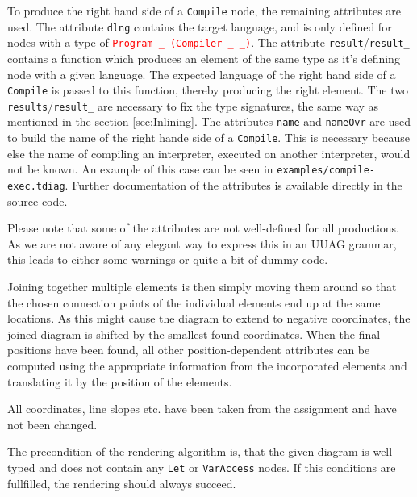 \documentclass[12pt, a4paper, twoside]{article}
\newcommand{\red}[1]{\textcolor{red}{#1}}
\begin{document}
To produce the right hand side of a \texttt{Compile} node, the remaining attributes are used. The attribute
\texttt{dlng} contains the target language, and is only defined for nodes with a type of \red{\texttt{Program \_ (Compiler \_ \_)}}.
The attribute \texttt{result}/\texttt{result\_} contains a function which produces an element of the same type
as it's defining node with a given language. The expected language of the right hand side of a \texttt{Compile} is 
passed to this function, thereby producing the right element.
The two \texttt{results}/\texttt{result\_} are necessary to fix the type signatures, the same way as mentioned
in the section \ref{sec:Inlining}.
The attributes \texttt{name} and \texttt{nameOvr} are used to build the name of the right hande side of a \texttt{Compile}.
This is necessary because else the name of compiling an interpreter, executed on another interpreter, would not be known.
An example of this case can be seen in \texttt{examples/compile-exec.tdiag}. Further documentation of the
attributes is available directly in the source code.

Please note that some of the attributes are not well-defined for all productions. As we are not aware of any elegant
way to express this in an UUAG grammar, this leads to either some warnings or quite a bit of dummy code.

Joining together multiple elements is then simply moving them around so that the chosen connection points
of the individual elements end up at the same locations. As this might cause the diagram to extend to
negative coordinates, the joined diagram is shifted by the smallest found coordinates.
When the final positions have been found, all other position-dependent attributes
can be computed using the appropriate information from the incorporated elements and translating
it by the position of the elements.

All coordinates, line slopes etc. have been taken from the assignment and have not been changed.

The precondition of the rendering algorithm is, that the given diagram is well-typed and does not contain
any \texttt{Let} or \texttt{VarAccess} nodes. If this conditions are fullfilled, the rendering should
always succeed. 
\end{document}
